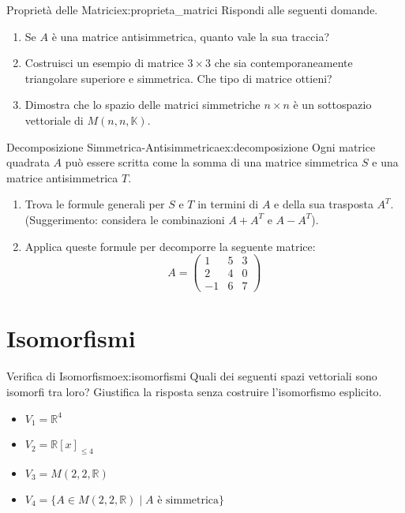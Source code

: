 \documentclass{article}
\begin{document}
\begin{exercise}{Proprietà delle Matrici}{ex:proprieta_matrici}
    Rispondi alle seguenti domande.
    \begin{enumerate}
        \item Se $A$ è una matrice antisimmetrica, quanto vale la sua traccia?
        \item Costruisci un esempio di matrice $3 \times 3$ che sia contemporaneamente triangolare superiore e simmetrica. Che tipo di matrice ottieni?
        \item Dimostra che lo spazio delle matrici simmetriche $n \times n$ è un sottospazio vettoriale di $M(n, n, \mathbb{K})$.
    \end{enumerate}
\end{exercise}

\begin{exercise}{Decomposizione Simmetrica-Antisimmetrica}{ex:decomposizione}
    Ogni matrice quadrata $A$ può essere scritta come la somma di una matrice simmetrica $S$ e una matrice antisimmetrica $T$.
    \begin{enumerate}
        \item Trova le formule generali per $S$ e $T$ in termini di $A$ e della sua trasposta $A^T$. (Suggerimento: considera le combinazioni $A+A^T$ e $A-A^T$).
        \item Applica queste formule per decomporre la seguente matrice:
        \[ A = \begin{pmatrix} 1 & 5 & 3 \\ 2 & 4 & 0 \\ -1 & 6 & 7 \end{pmatrix} \]
    \end{enumerate}
\end{exercise}

\section{Isomorfismi}

\begin{exercise}{Verifica di Isomorfismo}{ex:isomorfismi}
    Quali dei seguenti spazi vettoriali sono isomorfi tra loro? Giustifica la risposta senza costruire l'isomorfismo esplicito.
    \begin{itemize}
        \item $V_1 = \mathbb{R}^4$
        \item $V_2 = \mathbb{R}[x]_{\le 4}$
        \item $V_3 = M(2, 2, \mathbb{R})$
        \item $V_4 = \{ A \in M(2, 2, \mathbb{R}) \mid A \text{ è simmetrica} \}$
    \end{itemize}
\end{exercise}
\end{document}
